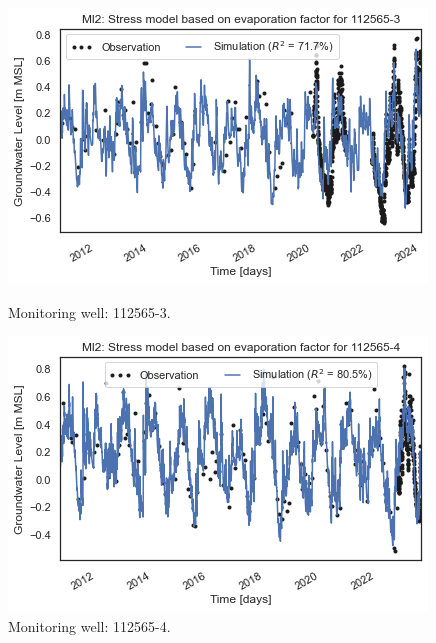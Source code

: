\begin{figure}[htbp]
    \centering
    \begin{minipage}{0.32\textwidth}
        \centering
        \includegraphics[width=\linewidth]{frontmatter/Rozenburg-fig/1125653.png}
        \caption{Monitoring well: 112565-3.}
        \label{SM2: start}
    \end{minipage}
    \hfill
    \begin{minipage}{0.32\textwidth}
        \centering
        \includegraphics[width=\linewidth]{frontmatter/Rozenburg-fig/1125654.png}
        \caption{Monitoring well: 112565-4.}
        \label{fig:112565-4}
    \end{minipage}
    \hfill
    \begin{minipage}{0.32\textwidth}
        \centering

\end{minipage}
\end{figure}

